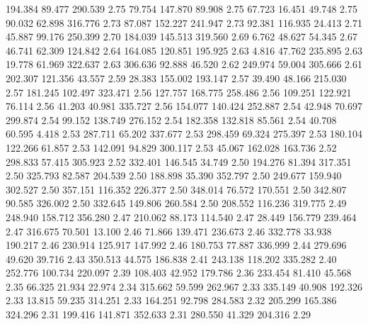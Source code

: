  194.384   89.477  290.539         2.75
  79.754  147.870   89.908         2.75
  67.723   16.451   49.748         2.75
  90.032   62.898  316.776         2.73
  87.087  152.227  241.947         2.73
  92.381  116.935   24.413         2.71
  45.887   99.176  250.399         2.70
 184.039  145.513  319.560         2.69
   6.762   48.627   54.345         2.67
  46.741   62.309  124.842         2.64
 164.085  120.851  195.925         2.63
   4.816   47.762  235.895         2.63
  19.778   61.969  322.637         2.63
 306.636   92.888   46.520         2.62
 249.974   59.004  305.666         2.61
 202.307  121.356   43.557         2.59
  28.383  155.002  193.147         2.57
  39.490   48.166  215.030         2.57
 181.245  102.497  323.471         2.56
 127.757  168.775  258.486         2.56
 109.251  122.921   76.114         2.56
  41.203   40.981  335.727         2.56
 154.077  140.424  252.887         2.54
  42.948   70.697  299.874         2.54
  99.152  138.749  276.152         2.54
 182.358  132.818   85.561         2.54
  40.708   60.595    4.418         2.53
 287.711   65.202  337.677         2.53
 298.459   69.324  275.397         2.53
 180.104  122.266   61.857         2.53
 142.091   94.829  300.117         2.53
  45.067  162.028  163.736         2.52
 298.833   57.415  305.923         2.52
 332.401  146.545   34.749         2.50
 194.276   81.394  317.351         2.50
 325.793   82.587  204.539         2.50
 188.898   35.390  352.797         2.50
 249.677  159.940  302.527         2.50
 357.151  116.352  226.377         2.50
 348.014   76.572  170.551         2.50
 342.807   90.585  326.002         2.50
 332.645  149.806  260.584         2.50
 208.552  116.236  319.775         2.49
 248.940  158.712  356.280         2.47
 210.062   88.173  114.540         2.47
  28.449  156.779  239.464         2.47
 316.675   70.501   13.100         2.46
  71.866  139.471  236.673         2.46
 332.778   33.938  190.217         2.46
 230.914  125.917  147.992         2.46
 180.753   77.887  336.999         2.44
 279.696   49.620   39.716         2.43
 350.513   44.575  186.838         2.41
 243.138  118.202  335.282         2.40
 252.776  100.734  220.097         2.39
 108.403   42.952  179.786         2.36
 233.454   81.410   45.568         2.35
  66.325   21.934   22.974         2.34
 315.662   59.599  262.967         2.33
 335.149   40.908  192.326         2.33
  13.815   59.235  314.251         2.33
 164.251   92.798  284.583         2.32
 205.299  165.386  324.296         2.31
 199.416  141.871  352.633         2.31
 280.550   41.329  204.316         2.29
